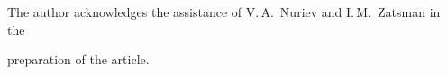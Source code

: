   

  







\Ack

\noindent

The author acknowledges the assistance of V.\,A.~Nuriev and I.\,M.~Zatsman in the

preparation of the article.








\renewcommand{\bibname}{\protect\rmfamily References}




